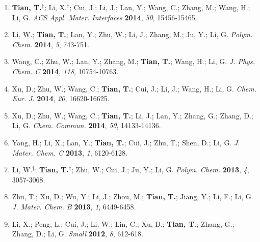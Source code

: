 \documentclass[margin]{res}
\begin{document}
\begin{resume}
\begin{enumerate}
  \item \textbf{Tian, T.}$^{\dagger}$; Li, X.$^{\dagger}$; Cui, J.; Li, J.; Lan, Y.; Wang, C.;
    Zhang, M.; Wang, H.; Li, G. \textit{ACS Appl. Mater. Interfaces}
    \textbf{2014}, \textit{50}, 15456-15465.
  \item Li, W.; \textbf{Tian, T.}; Lan, Y.; Zhu, W.; Li, J.; Zhang,
    M.; Ju, Y.; Li, G. \textit{Polym. Chem.} \textbf{2014},
    \textit{5}, 743-751.
  \item Wang, C.; Zhu, W.; Lan, Y.; Zhang, M.; \textbf{Tian, T.};
    Wang, H.; Li, G. \textit{J. Phys. Chem. C} \textbf{2014},
    \textit{118}, 10754-10763.
  \item Xu, D.; Zhu, W.; Wang, C.; \textbf{Tian, T.}; Cui, J.; Li, J.;
    Wang, H.; Li, G. \textit{Chem. Eur. J.} \textbf{2014},
    \textit{20}, 16620-16625.
  \item Xu, D.; Zhu, W.; Wang, C.; \textbf{Tian, T.}; Li, J.; Lan, Y.;
    Zhang, G.; Zhang, D.; Li, G. \textit{Chem. Commun.} \textbf{2014},
    \textit{50}, 14133-14136.
  \item Yang, H.; Li, X.; Lan, Y.; \textbf{Tian, T.}; Cui, J.; Zhu,
    T.; Shen, D.; Li, G. \textit{J. Mater. Chem. C} \textbf{2013},
    \textit{1}, 6120-6128.
  \item Li, W.$^{\dagger}$; \textbf{Tian, T.}$^{\dagger}$; Zhu, W.; Cui, J.; Ju, Y.; Li,
    G. \textit{Polym. Chem.} \textbf{2013}, \textit{4}, 3057-3068.
  \item Zhu, T.; Xu, D.; Wu, Y.; Li, J.; Zhou, M.; \textbf{Tian, T.};
    Jiang, Y.; Li, F.; Li, G. \textit{J. Mater. Chem. B}
    \textbf{2013}, \textit{1}, 6449-6458.
  \item Li, X.; Peng, L.; Cui, J.; Li, W.; Lin, C.; Xu, D.;
    \textbf{Tian, T.}; Zhang, G.; Zhang, D.; Li, G. \textit{Small}
    \textbf{2012}, \textit{8}, 612-618.

\end{enumerate}



\end{resume}
\end{document}
